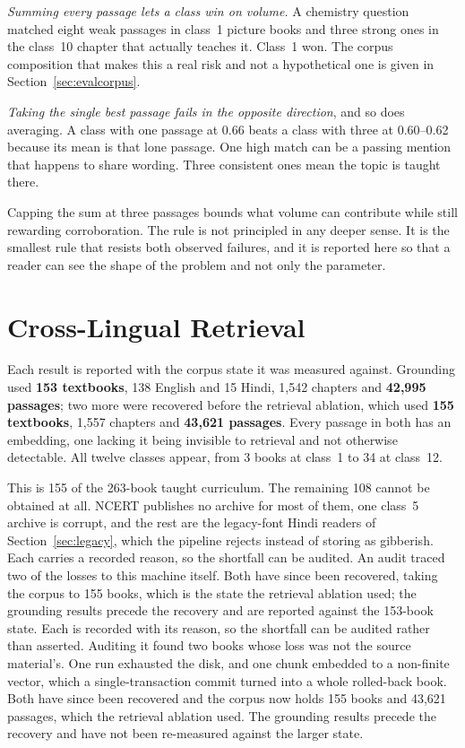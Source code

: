 \emph{Summing every passage lets a class win on volume.} A chemistry question matched eight weak passages in class~1 picture books and three strong ones in the class~10 chapter that actually teaches it. Class~1 won. The corpus composition that makes this a real risk and not a hypothetical one is given in Section~\ref{sec:evalcorpus}.

\emph{Taking the single best passage fails in the opposite direction}, and so does averaging. A class with one passage at 0.66 beats a class with three at 0.60--0.62 because its mean is that lone passage. One high match can be a passing mention that happens to share wording. Three consistent ones mean the topic is taught there.

Capping the sum at three passages bounds what volume can contribute while still rewarding corroboration. The rule is not principled in any deeper sense. It is the smallest rule that resists both observed failures, and it is reported here so that a reader can see the shape of the problem and not only the parameter.
\fi


\section{Cross-Lingual Retrieval}
\label{sec:cross_lingual}

\label{sec:evalcorpus}
Each result is reported with the corpus state it was measured against. Grounding used \textbf{153 textbooks}, 138 English and 15 Hindi, 1{,}542 chapters and \textbf{42{,}995 passages}; two more were recovered before the retrieval ablation, which used \textbf{155 textbooks}, 1{,}557 chapters and \textbf{43{,}621 passages}. Every passage in both has an embedding, one lacking it being invisible to retrieval and not otherwise detectable. All twelve classes appear, from 3 books at class~1 to 34 at class~12.

This is 155 of the 263-book taught curriculum. The remaining 108 cannot be obtained at all. NCERT publishes no archive for most of them, one class~5 archive is corrupt, and the rest are the legacy-font Hindi readers of Section~\ref{sec:legacy}, which the pipeline rejects instead of storing as gibberish. \ifconf Each carries a recorded reason, so the shortfall can be audited. An audit traced two of the losses to this machine itself. Both have since been recovered, taking the corpus to 155 books, which is the state the retrieval ablation used; the grounding results precede the recovery and are reported against the 153-book state. \else Each is recorded with its reason, so the shortfall can be audited rather than asserted. Auditing it found two books whose loss was not the source material's. One run exhausted the disk, and one chunk embedded to a non-finite vector, which a single-transaction commit turned into a whole rolled-back book. Both have since been recovered and the corpus now holds 155 books and 43{,}621 passages, which the retrieval ablation used. The grounding results precede the recovery and have not been re-measured against the larger state. \fi

